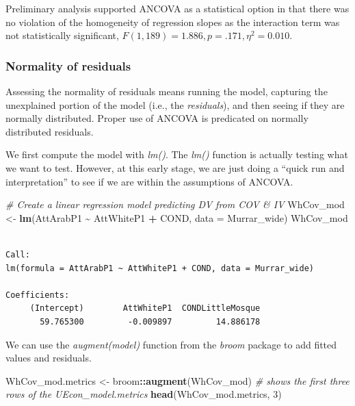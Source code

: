 \documentclass[
  11pt,
]{book}
\newenvironment{Shaded}{\begin{snugshade}}{\end{snugshade}}
\newcommand{\AttributeTok}[1]{\textcolor[rgb]{0.27,0.27,0.27}{#1}}
\newcommand{\CommentTok}[1]{\textcolor[rgb]{0.37,0.37,0.37}{\textit{#1}}}
\newcommand{\DecValTok}[1]{\textcolor[rgb]{0.06,0.06,0.06}{#1}}
\newcommand{\FunctionTok}[1]{\textcolor[rgb]{0.27,0.27,0.27}{\textbf{#1}}}
\newcommand{\NormalTok}[1]{#1}
\newcommand{\OtherTok}[1]{\textcolor[rgb]{0.37,0.37,0.37}{#1}}
\newcommand{\SpecialCharTok}[1]{\textcolor[rgb]{0.43,0.43,0.43}{\textbf{#1}}}
\begin{document}
Preliminary analysis supported ANCOVA as a statistical option in that there was no violation of the homogeneity of regression slopes as the interaction term was not statistically significant, \(F (1, 189) = 1.886, p = .171, \eta^2 = 0.010\).

\hypertarget{normality-of-residuals-1}{%
\subsubsection{Normality of residuals}\label{normality-of-residuals-1}}

Assessing the normality of residuals means running the model, capturing the unexplained portion of the model (i.e., the \emph{residuals}), and then seeing if they are normally distributed. Proper use of ANCOVA is predicated on normally distributed residuals.

We first compute the model with \emph{lm()}. The \emph{lm()} function is actually testing what we want to test. However, at this early stage, we are just doing a ``quick run and interpretation'' to see if we are within the assumptions of ANCOVA.

\begin{Shaded}
\begin{Highlighting}[]
\CommentTok{\# Create a linear regression model predicting DV from COV \& IV}
\NormalTok{WhCov\_mod }\OtherTok{\textless{}{-}} \FunctionTok{lm}\NormalTok{(AttArabP1 }\SpecialCharTok{\textasciitilde{}}\NormalTok{ AttWhiteP1 }\SpecialCharTok{+}\NormalTok{ COND, }\AttributeTok{data =}\NormalTok{ Murrar\_wide)}
\NormalTok{WhCov\_mod}
\end{Highlighting}
\end{Shaded}

\begin{verbatim}

Call:
lm(formula = AttArabP1 ~ AttWhiteP1 + COND, data = Murrar_wide)

Coefficients:
     (Intercept)        AttWhiteP1  CONDLittleMosque  
       59.765300         -0.009897         14.886178  
\end{verbatim}

We can use the \emph{augment(model)} function from the \emph{broom} package to add fitted values and residuals.

\begin{Shaded}
\begin{Highlighting}[]
\NormalTok{WhCov\_mod.metrics }\OtherTok{\textless{}{-}}\NormalTok{ broom}\SpecialCharTok{::}\FunctionTok{augment}\NormalTok{(WhCov\_mod)}
\CommentTok{\# shows the first three rows of the UEcon\_model.metrics}
\FunctionTok{head}\NormalTok{(WhCov\_mod.metrics, }\DecValTok{3}\NormalTok{)}
\end{Highlighting}
\end{Shaded}
\end{document}

